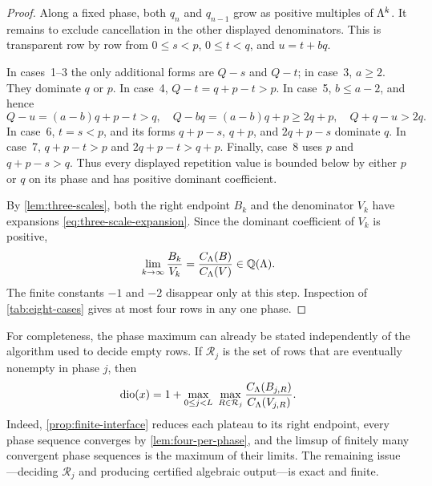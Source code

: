 \begin{proof}
Along a fixed phase, both $q_n$ and $q_{n-1}$ grow as positive multiples of
$\Lambda^k$.  It remains to exclude cancellation in the other displayed
denominators.  This is transparent row by row from
$0\leq s<p$, $0\leq t<q$, and $u=t+bq$.

In cases~1--3 the only additional forms are $Q-s$ and $Q-t$; in case~3,
$a\geq2$.  They dominate $q$ or $p$.  In case~4,
$Q-t=q+p-t>p$.  In case~5, $b\leq a-2$, and hence
\[
 Q-u=(a-b)q+p-t>q,
 \quad Q-bq=(a-b)q+p\geq2q+p,
 \quad Q+q-u>2q.
\]
In case~6, $t=s<p$, and its forms $q+p-s$, $q+p$, and $2q+p-s$
dominate $q$.  In case~7, $q+p-t>p$ and
$2q+p-t>q+p$.  Finally, case~8 uses $p$ and $q+p-s>q$.
Thus every displayed repetition value is bounded below by either $p$ or $q$
on its phase and has positive dominant coefficient.

By \cref{lem:three-scales}, both the right endpoint $B_k$ and the denominator
$V_k$ have expansions \eqref{eq:three-scale-expansion}.  Since the dominant
coefficient of $V_k$ is positive,
\[
 \lim_{k\to\infty}\frac{B_k}{V_k}
 =\frac{C_\Lambda(B)}{C_\Lambda(V)}\in\mathbb{Q}(\Lambda).
\]
The finite constants $-1$ and $-2$ disappear only at this step.  Inspection of
\cref{tab:eight-cases} gives at most four rows in any one phase.
\end{proof}

For completeness, the phase maximum can already be stated independently of
the algorithm used to decide empty rows.  If $\mathcal R_j$ is the set of rows
that are eventually nonempty in phase $j$, then
\begin{equation}
 \dio(x)=1+
 \max_{0\leq j<L}\ 
 \max_{R\in\mathcal R_j}
 \frac{C_\Lam(B_{j,R})}{C_\Lam(V_{j,R})}.
 \label{eq:finite-maximum}
\end{equation}
Indeed, \cref{prop:finite-interface} reduces each plateau to its right
endpoint, every phase sequence converges by \cref{lem:four-per-phase}, and the
limsup of finitely many convergent phase sequences is the maximum of their
limits.  The remaining issue---deciding $\mathcal R_j$ and producing certified
algebraic output---is exact and finite.

